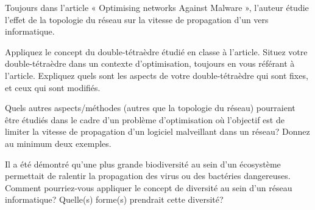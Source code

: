 
\begin{homeworkProblem}

	Toujours dans l’article « Optimising networks Against Malware », l’auteur étudie
	l’effet de la topologie du réseau sur la vitesse de propagation d’un vers informatique.\\
	
	\begin{homeworkSection}{5.1}
	
		Appliquez le concept du double-tétraèdre étudié en classe à l’article. Situez votre
		double-tétraèdre dans un contexte d’optimisation, toujours en vous référant à l’article.
		Expliquez quels sont les aspects de votre double-tétraèdre qui sont fixes, et ceux qui sont
		modifiés.
		
	\end{homeworkSection}
	
	\begin{homeworkSection}{5.2}
	
		Quels autres aspects/méthodes (autres que la topologie du réseau) pourraient être
		étudiés dans le cadre d’un problème d’optimisation où l’objectif est de limiter la vitesse
		de propagation d’un logiciel malveillant dans un réseau? Donnez au minimum deux
		exemples.
	
	\end{homeworkSection}
	
	\begin{homeworkSection}{5.3}
		
		Il a été démontré qu’une plus grande biodiversité au sein d’un écosystème permettait
		de ralentir la propagation des virus ou des bactéries dangereuses. Comment pourriez-vous
		appliquer le concept de diversité au sein d’un réseau informatique? Quelle(s) forme(s)
		prendrait cette diversité? 
	
	\end{homeworkSection}


\end{homeworkProblem}